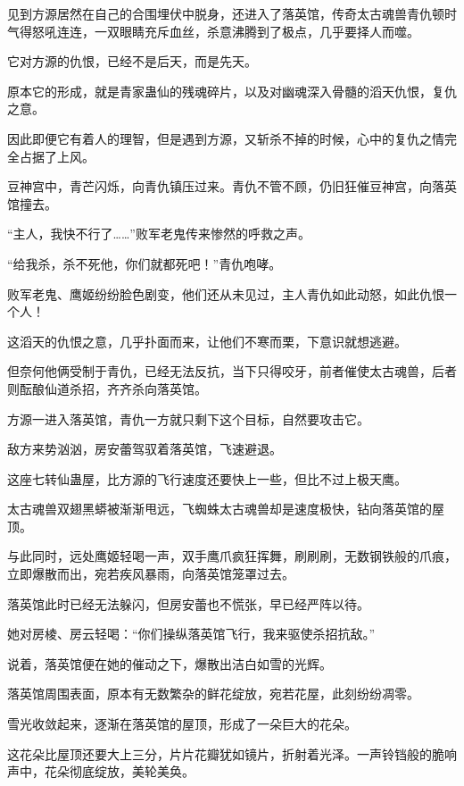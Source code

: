 
\begin{this_body}

见到方源居然在自己的合围埋伏中脱身，还进入了落英馆，传奇太古魂兽青仇顿时气得怒吼连连，一双眼睛充斥血丝，杀意沸腾到了极点，几乎要择人而噬。

它对方源的仇恨，已经不是后天，而是先天。

原本它的形成，就是青家蛊仙的残魂碎片，以及对幽魂深入骨髓的滔天仇恨，复仇之意。

因此即便它有着人的理智，但是遇到方源，又斩杀不掉的时候，心中的复仇之情完全占据了上风。

豆神宫中，青芒闪烁，向青仇镇压过来。青仇不管不顾，仍旧狂催豆神宫，向落英馆撞去。

“主人，我快不行了……”败军老鬼传来惨然的呼救之声。

“给我杀，杀不死他，你们就都死吧！”青仇咆哮。

败军老鬼、鹰姬纷纷脸色剧变，他们还从未见过，主人青仇如此动怒，如此仇恨一个人！

这滔天的仇恨之意，几乎扑面而来，让他们不寒而栗，下意识就想逃避。

但奈何他俩受制于青仇，已经无法反抗，当下只得咬牙，前者催使太古魂兽，后者则酝酿仙道杀招，齐齐杀向落英馆。

方源一进入落英馆，青仇一方就只剩下这个目标，自然要攻击它。

敌方来势汹汹，房安蕾驾驭着落英馆，飞速避退。

这座七转仙蛊屋，比方源的飞行速度还要快上一些，但比不过上极天鹰。

太古魂兽双翅黑蟒被渐渐甩远，飞蜘蛛太古魂兽却是速度极快，钻向落英馆的屋顶。

与此同时，远处鹰姬轻喝一声，双手鹰爪疯狂挥舞，刷刷刷，无数钢铁般的爪痕，立即爆散而出，宛若疾风暴雨，向落英馆笼罩过去。

落英馆此时已经无法躲闪，但房安蕾也不慌张，早已经严阵以待。

她对房棱、房云轻喝：“你们操纵落英馆飞行，我来驱使杀招抗敌。”

说着，落英馆便在她的催动之下，爆散出洁白如雪的光辉。

落英馆周围表面，原本有无数繁杂的鲜花绽放，宛若花屋，此刻纷纷凋零。

雪光收敛起来，逐渐在落英馆的屋顶，形成了一朵巨大的花朵。

这花朵比屋顶还要大上三分，片片花瓣犹如镜片，折射着光泽。一声铃铛般的脆响声中，花朵彻底绽放，美轮美奂。


\end{this_body}
